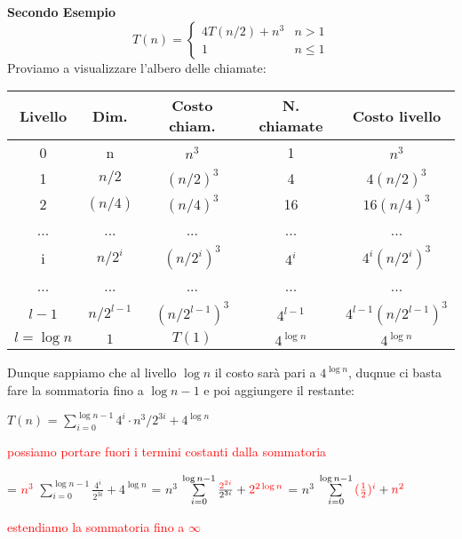\documentclass[../cheatSheetAlgoritmi.tex]{subfiles}
\begin{document}
\textbf{Secondo Esempio}
	\begin{equation*}
  		T(n)=\begin{cases}
    		4T(n/2) + n^{3} & \text{$n > 1$}\\
    		1 & \text{$n \leq 1$}
  		\end{cases}
	\end{equation*}
Proviamo a visualizzare l'albero delle chiamate:
\begin{center}
	\renewcommand{\arraystretch}{1.2}
	\begin{tabular}{ |c|c|c|c|c| } 
		\hline
			Livello & Dim. & Costo chiam. & N. chiamate & Costo livello \\ 
		\hline
			0 & n & $n^3$ & 1 & $n^3$ \\ 
		\hline
			1 & $n/2$ & $(n/2)^{3}$ & 4 & $4(n/2)^{3}$\\ 
		\hline
			2 & $(n/4)$ & $(n/4)^{3}$ & 16 & $16(n/4)^{3}$\\
		\hline
			... & ... & ... & ... & ...\\
		\hline
			i & $n/2^{i}$ & $(n/2^{i})^{3}$ & $4^{i}$ & $4^{i}(n/2^{i})^{3}$\\
		\hline
			... & ... & ... & ... & ...\\
		\hline
			$l-1$ & $n/2^{l-1}$ & $(n/2^{l-1})^{3}$ & $4^{l-1}$ & $4^{l-1}(n/2^{l-1})^{3}$\\
		\hline
			$l = \log{n}$ & $1$ & $T(1)$ & $4^{\log{n}}$ & $4^{\log{n}}$\\
		\hline
	\end{tabular}
\end{center}
Dunque sappiamo che al livello $\log{n}$ il costo sarà pari a $4^{\log{n}}$, duqnue ci basta fare la sommatoria fino a $\log{n-1}$ e poi aggiungere il restante:

$T(n)$ =  $\sum\limits_{i=0}^{\log{n-1}} {4^{i} \cdot n^{3}/2^{3i}} + 4^{\log{n}}$

\bigskip

\textcolor{red}{possiamo portare fuori i termini costanti dalla sommatoria}

\bigskip

= \textcolor{red}{$n^{3}$} $\sum\limits_{i=0}^{\log{n-1}} {\frac{4^{i}}{2^{3i}}} + 4^{\log{n}}$ = $n^{3}$ $\sum\limits_{i=0}^{\log{n-1}} {\frac{\textcolor{red}{2^{2i}}}{2^{3i}}} + \textcolor{red}{2^{2\log{n}}}$ = $n^{3}$ $\sum\limits_{i=0}^{\log{n-1}} {\textcolor{red}{(\frac{1}{2})^{i}}} + \textcolor{red}{n^{2}}$

\bigskip

\textcolor{red}{estendiamo la sommatoria fino a $\infty$}
\end{document}
